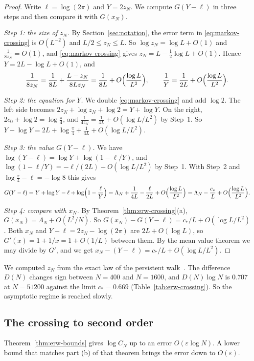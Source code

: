 \begin{proof}
Write $\ell=\log(2\pi)$ and $Y=2z_N$. We compute $G(Y-\ell)$ in three steps
and then compare it with $G(x_N)$.

\emph{Step 1: the size of $z_N$.} By Section~\ref{sec:notation}, the error term
in \eqref{eq:markov-crossing} is $O(L^{-2})$ and $L/2\le z_N\le L$. So
$\log z_N=\log L+O(1)$ and $\frac1{8z_N}=O(1)$, and
\eqref{eq:markov-crossing} gives $z_N=L-\frac12\log L+O(1)$. Hence
$Y=2L-\log L+O(1)$, and
\[
 \frac1{8z_N}=\frac1{8L}+\frac{L-z_N}{8Lz_N}=\frac1{8L}+O\Bigl(\frac{\log L}{L^2}\Bigr),
 \qquad\frac1Y=\frac1{2L}+O\Bigl(\frac{\log L}{L^2}\Bigr).
\]

\emph{Step 2: the equation for $Y$.} We double \eqref{eq:markov-crossing} and
add $\log2$. The left side becomes $2z_N+\log z_N+\log2=Y+\log Y$. On the
right, $2c_0+\log2=\log\frac\pi4$, and $\frac1{4z_N}=\frac1{4L}+O(\log L/L^2)$
by Step~1. So $Y+\log Y=2L+\log\frac\pi4+\frac1{4L}+O(\log L/L^2)$.

\emph{Step 3: the value $G(Y-\ell)$.} We have
$\log(Y-\ell)=\log Y+\log(1-\ell/Y)$, and
$\log(1-\ell/Y)=-\ell/(2L)+O(\log L/L^2)$ by Step~1. With Step~2 and
$\log\frac\pi4-\ell=-\log8$ this gives
\[
 G(Y-\ell)=Y+\log Y-\ell+\log\Bigl(1-\frac\ell Y\Bigr)
 =\Lambda_N+\frac1{4L}-\frac\ell{2L}+O\Bigl(\frac{\log L}{L^2}\Bigr)
 =\Lambda_N-\frac{c_*}L+O\Bigl(\frac{\log L}{L^2}\Bigr).
\]

\emph{Step 4: compare with $x_N$.} By Theorem~\ref{thm:erw-crossing}(a),
$G(x_N)=\Lambda_N+O(L^2/N)$. So
$G(x_N)-G(Y-\ell)=c_*/L+O(\log L/L^2)$. Both $x_N$ and
$Y-\ell=2z_N-\log(2\pi)$ are $2L+O(\log L)$, so $G'(x)=1+1/x=1+O(1/L)$
between them. By the mean value theorem we may divide by $G'$, and we get
$x_N-(Y-\ell)=c_*/L+O(\log L/L^2)$.
\end{proof}

We computed $z_N$ from the exact law of the persistent walk~\cite{paperA}. The
difference $D(N)$ changes sign between $N=400$ and $N=1600$, and
$D(N)\log N$ is $0.707$ at $N=51200$ against the limit $c_*=0.669$
(Table~\ref{tab:erw-crossing}). So the asymptotic regime is reached slowly.

\subsection{The crossing to second order}\label{sec:erw-second}

Theorem~\ref{thm:erw-bounds} gives $\log C_N$ up to an error
$O(\varepsilon\log N)$. A lower bound that matches part (b) of that theorem
brings the error down to $O(\varepsilon)$.

